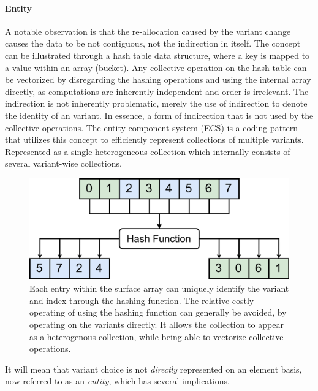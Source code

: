 \documentclass{article}
\begin{document}
\newpage

\paragraph{Entity}

A notable observation is that the re-allocation caused by the variant change causes the data to be not contiguous, not the indirection in itself.
The concept can be illustrated through a hash table data structure, where a key is mapped to a value within an array (bucket).
Any collective operation on the hash table can be vectorized by disregarding the hashing operations and using the internal array directly, as computations are inherently independent and order is irrelevant.   
The indirection is not inherently problematic, merely the use of indirection to denote the identity of an variant.
In essence, a form of indirection that is not used by the collective operations. 
The entity-component-system (ECS) is a coding pattern that utilizes this concept to efficiently represent collections of multiple variants.
Represented as a single heterogeneous collection which internally consists of several variant-wise collections. 

\begin{figure}[ht]
    \centering
    \includegraphics[scale=0.1]{HashTableECS.png}
    \caption
    { 
        Each entry within the surface array can uniquely identify the variant and index through the hashing function.
        The relative costly operating of using the hashing function can generally be avoided, by operating on the variants directly.
        It allows the collection to appear as a heterogenous collection, while being able to vectorize collective operations.
    }
\end{figure}

It will mean that variant choice is not {\it directly} represented on an element basis, now referred to as an {\it entity}, which has several implications.
\end{document}
